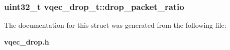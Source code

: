 \subsubsection{\setlength{\rightskip}{0pt plus 5cm}uint32\_\-t \bf{vqec\_\-drop\_\-t::drop\_\-packet\_\-ratio}}\label{structvqec__drop__t_1c9b2227cdced7bf4b60749d0d811fd6}




The documentation for this struct was generated from the following file:\begin{CompactItemize}
\item 
\bf{vqec\_\-drop.h}\end{CompactItemize}
